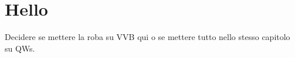 
\chapter{Hello}

Decidere se mettere la roba su VVB qui o se mettere tutto nello stesso capitolo su QWs.
